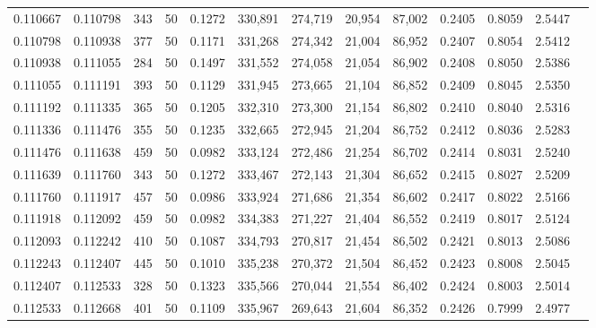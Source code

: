 \begin{tabular}{rrrrrrrrrrrrr}
0.110667 & 0.110798 &   343 &  50 &                                     0.1272 & 330,891 & 274,719 &  20,954 &  87,002 & 0.2405 & 0.8059 & 2.5447 \\
0.110798 & 0.110938 &   377 &  50 &                                     0.1171 & 331,268 & 274,342 &  21,004 &  86,952 & 0.2407 & 0.8054 & 2.5412 \\
0.110938 & 0.111055 &   284 &  50 &                                     0.1497 & 331,552 & 274,058 &  21,054 &  86,902 & 0.2408 & 0.8050 & 2.5386 \\
0.111055 & 0.111191 &   393 &  50 &                                     0.1129 & 331,945 & 273,665 &  21,104 &  86,852 & 0.2409 & 0.8045 & 2.5350 \\
0.111192 & 0.111335 &   365 &  50 &                                     0.1205 & 332,310 & 273,300 &  21,154 &  86,802 & 0.2410 & 0.8040 & 2.5316 \\
0.111336 & 0.111476 &   355 &  50 &                                     0.1235 & 332,665 & 272,945 &  21,204 &  86,752 & 0.2412 & 0.8036 & 2.5283 \\
0.111476 & 0.111638 &   459 &  50 &                                     0.0982 & 333,124 & 272,486 &  21,254 &  86,702 & 0.2414 & 0.8031 & 2.5240 \\
0.111639 & 0.111760 &   343 &  50 &                                     0.1272 & 333,467 & 272,143 &  21,304 &  86,652 & 0.2415 & 0.8027 & 2.5209 \\
0.111760 & 0.111917 &   457 &  50 &                                     0.0986 & 333,924 & 271,686 &  21,354 &  86,602 & 0.2417 & 0.8022 & 2.5166 \\
0.111918 & 0.112092 &   459 &  50 &                                     0.0982 & 334,383 & 271,227 &  21,404 &  86,552 & 0.2419 & 0.8017 & 2.5124 \\
0.112093 & 0.112242 &   410 &  50 &                                     0.1087 & 334,793 & 270,817 &  21,454 &  86,502 & 0.2421 & 0.8013 & 2.5086 \\
0.112243 & 0.112407 &   445 &  50 &                                     0.1010 & 335,238 & 270,372 &  21,504 &  86,452 & 0.2423 & 0.8008 & 2.5045 \\
0.112407 & 0.112533 &   328 &  50 &                                     0.1323 & 335,566 & 270,044 &  21,554 &  86,402 & 0.2424 & 0.8003 & 2.5014 \\
0.112533 & 0.112668 &   401 &  50 &                                     0.1109 & 335,967 & 269,643 &  21,604 &  86,352 & 0.2426 & 0.7999 & 2.4977 \\

\end{tabular}
